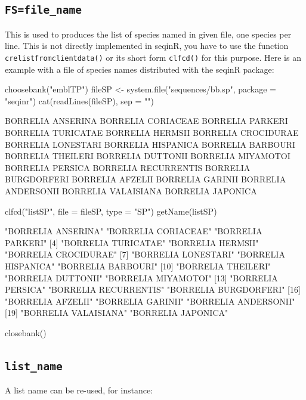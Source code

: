 \documentclass{article}
\begin{document}
\subsection{\texttt{FS=file\_name}}

This is used to produces the list of species named in given file, one species per line.
This is not directly implemented in seqinR, you have to use the function
\texttt{crelistfromclientdata()} or its short form \texttt{clfcd()} for this purpose. Here is an example with
a file of species names distributed with the seqinR package:

\begin{Schunk}
\begin{Sinput}
 choosebank("emblTP")
 fileSP <- system.file("sequences/bb.sp", package = "seqinr")
 cat(readLines(fileSP), sep = "\n")
\end{Sinput}
\begin{Soutput}
BORRELIA ANSERINA
BORRELIA CORIACEAE
BORRELIA PARKERI
BORRELIA TURICATAE
BORRELIA HERMSII
BORRELIA CROCIDURAE
BORRELIA LONESTARI
BORRELIA HISPANICA
BORRELIA BARBOURI
BORRELIA THEILERI
BORRELIA DUTTONII
BORRELIA MIYAMOTOI
BORRELIA PERSICA
BORRELIA RECURRENTIS
BORRELIA BURGDORFERI
BORRELIA AFZELII
BORRELIA GARINII
BORRELIA ANDERSONII
BORRELIA VALAISIANA
BORRELIA JAPONICA
\end{Soutput}
\begin{Sinput}
 clfcd("listSP", file = fileSP, type = "SP")
 getName(listSP)
\end{Sinput}
\begin{Soutput}
 [1] "BORRELIA ANSERINA"    "BORRELIA CORIACEAE"   "BORRELIA PARKERI"    
 [4] "BORRELIA TURICATAE"   "BORRELIA HERMSII"     "BORRELIA CROCIDURAE" 
 [7] "BORRELIA LONESTARI"   "BORRELIA HISPANICA"   "BORRELIA BARBOURI"   
[10] "BORRELIA THEILERI"    "BORRELIA DUTTONII"    "BORRELIA MIYAMOTOI"  
[13] "BORRELIA PERSICA"     "BORRELIA RECURRENTIS" "BORRELIA BURGDORFERI"
[16] "BORRELIA AFZELII"     "BORRELIA GARINII"     "BORRELIA ANDERSONII" 
[19] "BORRELIA VALAISIANA"  "BORRELIA JAPONICA"   
\end{Soutput}
\begin{Sinput}
 closebank()
\end{Sinput}
\end{Schunk}

\subsection{\texttt{list\_name}}

A list name can be re-used, for instance:
\end{document}
